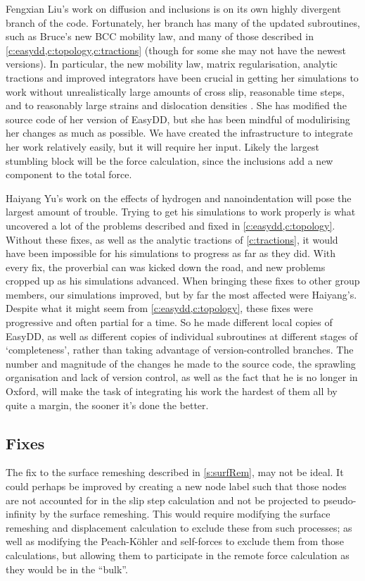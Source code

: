 Fengxian Liu's work on diffusion and inclusions is on its own highly divergent branch of the code. Fortunately, her branch has many of the updated subroutines, such as Bruce's new BCC mobility law, and many of those described in \cref{c:easydd,c:topology,c:tractions} (though for some she may not have the newest versions). In particular, the new mobility law, matrix regularisation, analytic tractions and improved integrators have been crucial in getting her simulations to work without unrealistically large amounts of cross slip, reasonable time steps, and to reasonably large strains and dislocation densities \cite{fengxian}. She has modified the source code of her version of EasyDD, but she has been mindful of modulirising her changes as much as possible. We have created the infrastructure to integrate her work relatively easily, but it will require her input. Likely the largest stumbling block will be the force calculation, since the inclusions add a new component to the total force.

Haiyang Yu's work on the effects of hydrogen and nanoindentation \cite{YU2018} will pose the largest amount of trouble. Trying to get his simulations to work properly is what uncovered a lot of the problems described and fixed in \cref{c:easydd,c:topology}. Without these fixes, as well as the analytic tractions of \cref{c:tractions}, it would have been impossible for his simulations to progress as far as they did. With every fix, the proverbial can was kicked down the road, and new problems cropped up as his simulations advanced. When bringing these fixes to other group members, our simulations improved, but by far the most affected were Haiyang's. Despite what it might seem from \cref{c:easydd,c:topology}, these fixes were progressive and often partial for a time. So he made different local copies of EasyDD, as well as different copies of individual subroutines at different stages of `completeness', rather than taking advantage of version-controlled branches. The number and magnitude of the changes he made to the source code, the sprawling organisation and lack of version control, as well as the fact that he is no longer in Oxford, will make the task of integrating his work the hardest of them all by quite a margin, the sooner it's done the better.

\subsection{Fixes}

The fix to the surface remeshing described in \cref{s:surfRem}, may not be ideal. It could perhaps be improved by creating a new node label such that those nodes are not accounted for in the slip step calculation and not be projected to pseudo-infinity by the surface remeshing. This would require modifying the surface remeshing and displacement calculation to exclude these from such processes; as well as modifying the Peach-K\"{o}hler and self-forces to exclude them from those calculations, but allowing them to participate in the remote force calculation as they would be in the ``bulk''.

